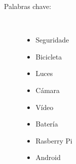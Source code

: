 \begin{description}
\item [Palabras chave:] \mbox{} \\[-20pt]
  \begin{itemize}
    \item Seguridade
    \item Bicicleta
    \item Luces
    \item Cámara
    \item Vídeo
    \item Batería
    \item Rasberry Pi
    \item Android
  \end{itemize}
\end{description}
